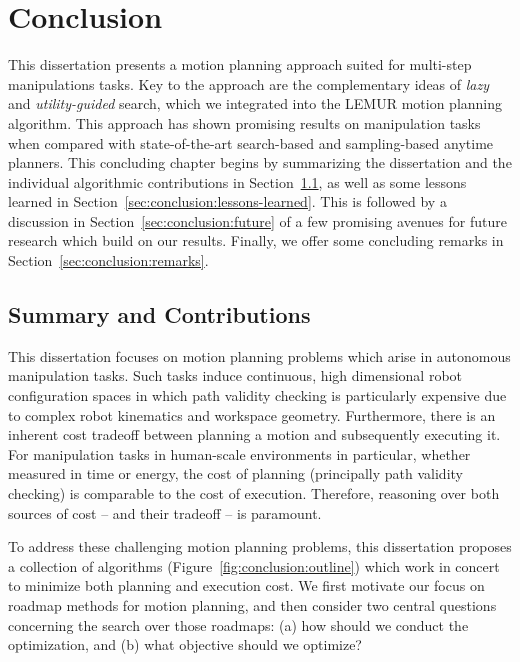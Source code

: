 \chapter{Conclusion}
\label{chap:conclusion}

This dissertation presents a motion planning approach suited for
multi-step manipulations tasks.
Key to the approach are the complementary ideas of \emph{lazy}
and \emph{utility-guided} search,
which we integrated into the LEMUR motion planning algorithm.
This approach has shown promising results on manipulation tasks
when compared with state-of-the-art
search-based and sampling-based anytime planners.
This concluding chapter begins by summarizing the dissertation
and the individual algorithmic contributions
in Section~\ref{sec:conclusion:summary},
as well as some lessons learned
in Section~\ref{sec:conclusion:lessons-learned}.
This is followed by a discussion in Section~\ref{sec:conclusion:future}
of a few promising avenues for future research
which build on our results.
Finally, we offer some concluding remarks
in Section~\ref{sec:conclusion:remarks}.


\section{Summary and Contributions}
\label{sec:conclusion:summary}

This dissertation focuses on motion planning problems
which arise in autonomous manipulation tasks.
Such tasks induce continuous, high dimensional robot configuration
spaces
in which path validity checking is particularly expensive
due to complex robot kinematics and workspace geometry.
Furthermore,
there is an inherent cost tradeoff between
planning a motion and subsequently executing it.
For manipulation tasks in human-scale environments in particular,
whether measured in time or energy,
the cost of planning (principally path validity checking)
is comparable to the cost of execution.
Therefore,
reasoning over both sources of cost -- and their tradeoff --
is paramount.

To address these challenging motion planning problems,
this dissertation proposes a collection of algorithms
(Figure~\ref{fig:conclusion:outline})
which work in concert to minimize both planning and execution cost.
We first motivate our focus on roadmap methods for motion
planning,
and then consider two central questions concerning the search
over those roadmaps:
(a) how should we conduct the optimization,
and (b) what objective should we optimize?

